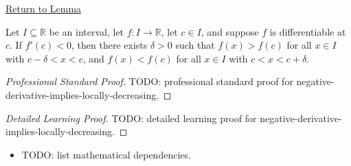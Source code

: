 \newpage
{}
\label{prf:negative-derivative-implies-locally-decreasing}

\begin{remark*}[Return]
\hyperref[lem:negative-derivative-implies-locally-decreasing]{Return to Lemma}
\end{remark*}

\begin{lemma*}
Let $I \subseteq \mathbb{R}$ be an interval, let $f : I \to \mathbb{R}$, let $c \in I$, and suppose $f$ is differentiable at $c$. If $f'(c) < 0$, then there exists $\delta > 0$ such that $f(x) > f(c)$ for all $x \in I$ with $c - \delta < x < c$, and $f(x) < f(c)$ for all $x \in I$ with $c < x < c + \delta$.
\end{lemma*}

\begin{proof}[Professional Standard Proof]
\LRAProofBodyStart
TODO: professional standard proof for negative-derivative-implies-locally-decreasing.
\end{proof}

\begin{proof}[Detailed Learning Proof]
\LRAProofBodyStart
TODO: detailed learning proof for negative-derivative-implies-locally-decreasing.
\end{proof}

\begin{remark*}
\end{remark*}

\begin{dependencies}
\begin{itemize}
  \item TODO: list mathematical dependencies.
\end{itemize}
\end{dependencies}

\clearpage

